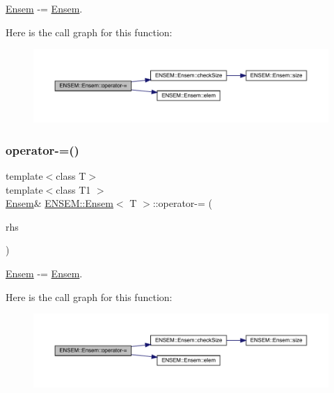 \mbox{\hyperlink{classENSEM_1_1Ensem}{Ensem}} -\/= \mbox{\hyperlink{classENSEM_1_1Ensem}{Ensem}}. 

Here is the call graph for this function\+:
\nopagebreak
\begin{figure}[H]
\begin{center}
\leavevmode
\includegraphics[width=350pt]{d7/d3e/classENSEM_1_1Ensem_ae3f3e36d96a4600e56c2b139e7897186_cgraph}
\end{center}
\end{figure}
\mbox{\label{classENSEM_1_1Ensem_ae3f3e36d96a4600e56c2b139e7897186}} 
\subsubsection{\texorpdfstring{operator-\/=()}{operator-=()}\hspace{0.1cm}{\footnotesize\ttfamily [6/6]}}
{\footnotesize\ttfamily template$<$class T$>$ \\
template$<$class T1 $>$ \\
\mbox{\hyperlink{classENSEM_1_1Ensem}{Ensem}}\& \mbox{\hyperlink{classENSEM_1_1Ensem}{E\+N\+S\+E\+M\+::\+Ensem}}$<$ T $>$\+::operator-\/= (\begin{DoxyParamCaption}\item[{const \mbox{\hyperlink{classENSEM_1_1Ensem}{Ensem}}$<$ T1 $>$ \&}]{rhs }\end{DoxyParamCaption})\hspace{0.3cm}{\ttfamily [inline]}}



\mbox{\hyperlink{classENSEM_1_1Ensem}{Ensem}} -\/= \mbox{\hyperlink{classENSEM_1_1Ensem}{Ensem}}. 

Here is the call graph for this function\+:
\nopagebreak
\begin{figure}[H]
\begin{center}
\leavevmode
\includegraphics[width=350pt]{d7/d3e/classENSEM_1_1Ensem_ae3f3e36d96a4600e56c2b139e7897186_cgraph}
\end{center}
\end{figure}
\mbox{\label{classENSEM_1_1Ensem_a32bf70c0844ce98695151457bf9df018}} 

